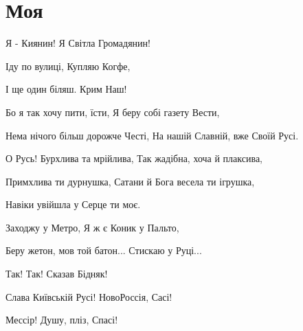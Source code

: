  
 


\chapter{Моя}
\label{sec:poetry.my}

Я - Киянин!
Я Світла Громадянин!

Іду по вулиці,
Купляю Когфе,

І ще один біляш. Крим Наш!

Бо я так хочу пити, їсти,
Я беру собі газету Вести,

Нема нічого більш дорожче Честі,
На нашій Славній, вже Своїй Русі.

О Русь! Бурхлива та мрійлива,
Так жадібна, хоча й плаксива,

Примхлива ти дурнушка,
Сатани й Бога весела ти ігрушка,

Навіки увійшла у Серце ти моє.

Заходжу у Метро,
Я ж є Коник у Пальто,

Беру жетон, мов той батон...
Стискаю у Руці...

Так! Так! Сказав Бідняк!

Слава Київській Русі! НовоРоссія, Сасі!

Мессір! Душу, пліз, Спасі!





